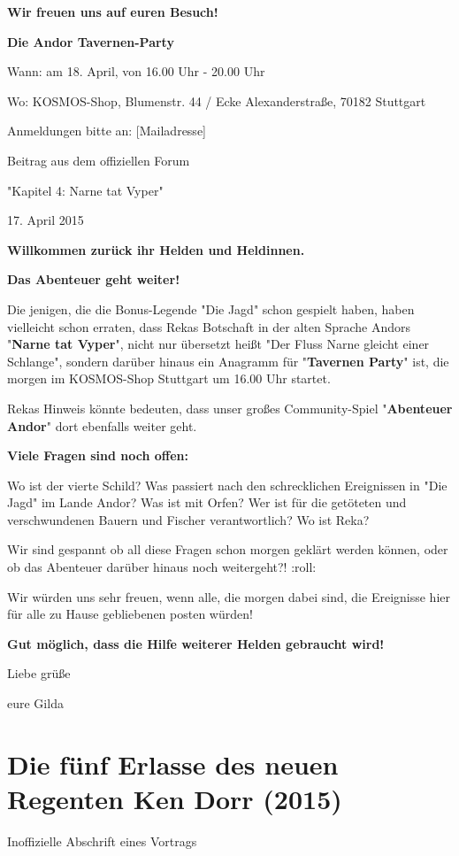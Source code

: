 \documentclass[10pt, a4paper, oneside]{book}
\newcommand{\fillbreak}{\vspace*{\fill}\columnbreak}
\newcommand{\storytext}[1]{%
    \section{#1}%
    \label{Storytext: #1}%
}
\begin{document}
\begin{multicols}{2}
\textbf{Wir freuen uns auf euren Besuch!}

\textbf{Die Andor Tavernen-Party}

Wann: am 18. April, von 16.00 Uhr - 20.00 Uhr

Wo: KOSMOS-Shop, Blumenstr. 44 / Ecke Alexanderstraße, 70182 Stuttgart

Anmeldungen bitte an: [Mailadresse]


\begin{center}
    Beitrag aus dem offiziellen Forum

    "Kapitel 4: Narne tat Vyper"

    17. April 2015
\end{center}

\textbf{Willkommen zurück ihr Helden und Heldinnen.}

\textbf{Das Abenteuer geht weiter!}

Die jenigen, die die Bonus-Legende "Die Jagd" schon gespielt haben, haben vielleicht schon erraten, dass Rekas Botschaft in der alten Sprache Andors "\textbf{Narne tat Vyper}", nicht nur übersetzt heißt "Der Fluss Narne gleicht einer Schlange", sondern darüber hinaus ein Anagramm für "\textbf{Tavernen Party}" ist, die morgen im KOSMOS-Shop Stuttgart um 16.00 Uhr startet.

Rekas Hinweis könnte bedeuten, dass unser großes Community-Spiel "\textbf{Abenteuer Andor}" dort ebenfalls weiter geht.

\textbf{Viele Fragen sind noch offen:}

Wo ist der vierte Schild? Was passiert nach den schrecklichen Ereignissen in "Die Jagd" im Lande Andor? Was ist mit Orfen? Wer ist für die getöteten und verschwundenen Bauern und Fischer verantwortlich? Wo ist Reka?

Wir sind gespannt ob all diese Fragen schon morgen geklärt werden können, oder ob das Abenteuer darüber hinaus noch weitergeht?! :roll:

Wir würden uns sehr freuen, wenn alle, die morgen dabei sind, die Ereignisse hier für alle zu Hause gebliebenen posten würden!

\textbf{Gut möglich, dass die Hilfe weiterer Helden gebraucht wird!}


Liebe grüße

eure Gilda



\fillbreak
\storytext{Die fünf Erlasse des neuen Regenten Ken Dorr (2015)}

\begin{center}
    Inoffizielle Abschrift eines Vortrags
\end{center}


\end{multicols}
\end{document}
